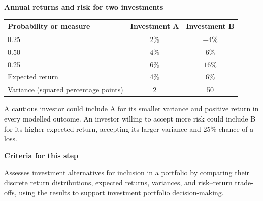 
\begin{center}
\textbf{Annual returns and risk for two investments}\par\nobreak\smallskip
\begin{tabular}{@{}lcc@{}}
\toprule
\textbf{Probability or measure} & \textbf{Investment A} & \textbf{Investment B}\\
\midrule
0.25 & \(2\%\) & \(-4\%\)\\
0.50 & \(4\%\) & \(6\%\)\\
0.25 & \(6\%\) & \(16\%\)\\
\midrule
Expected return & \(4\%\) & \(6\%\)\\
Variance (squared percentage points) & 2 & 50\\
\bottomrule
\end{tabular}
\end{center}

A cautious investor could include A for its smaller variance and positive return in every modelled outcome. An investor willing to accept more risk could include B for its higher expected return, accepting its larger variance and \(25\%\) chance of a loss.

\textbf{Criteria for this step}
\begin{stepcriteria}
\item[C10] Assesses investment alternatives for inclusion in a portfolio by comparing their discrete return distributions, expected returns, variances, and risk--return trade-offs, using the results to support investment portfolio decision-making.
\end{stepcriteria}


